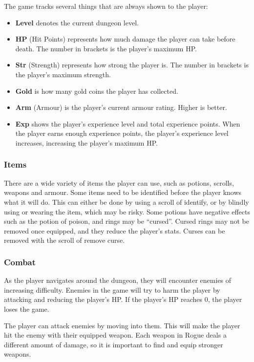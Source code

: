 \documentclass[11pt,a4paper]{article}
\begin{document}
    The game tracks several things that are always shown to the player:
    \begin{itemize}
        \item \textbf{Level} denotes the current dungeon level.
        \item \textbf{HP} (Hit Points) represents how much damage the player can take before death. The number in brackets is the player's maximum HP.
        \item \textbf{Str} (Strength) represents how strong the player is. The number in brackets is the player's maximum strength.
        \item \textbf{Gold} is how many gold coins the player has collected.
        \item \textbf{Arm} (Armour) is the player's current armour rating. Higher is better.
        \item \textbf{Exp} shows the player's experience level and total experience points. When the player earns enough experience points, the player's experience level increases, increasing the player's maximum HP.
    \end{itemize}

    \subsubsection{Items}
    There are a wide variety of items the player can use, such as potions, scrolls, weapons and armour.
    Some items need to be identified before the player knows what it will do.
    This can either be done by using a scroll of identify, or by blindly using or wearing the item, which may be risky.
    Some potions have negative effects such as the potion of poison, and rings may be ``cursed''.
    Cursed rings may not be removed once equipped, and they reduce the player's stats.
    Curses can be removed with the scroll of remove curse.

    \subsubsection{Combat}
    As the player navigates around the dungeon, they will encounter enemies of increasing difficulty.
    Enemies in the game will try to harm the player by attacking and reducing the player's HP\@.
    If the player's HP reaches 0, the player loses the game.

    The player can attack enemies by moving into them.
    This will make the player hit the enemy with their equipped weapon.
    Each weapon in Rogue deals a different amount of damage, so it is important to find and equip stronger weapons.
\end{document}
